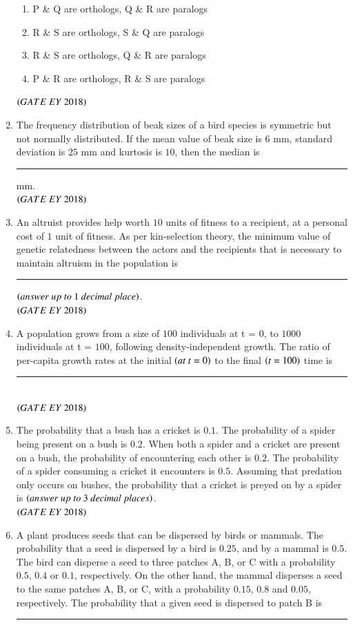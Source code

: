 \documentclass[journal]{IEEEtran}
\numberwithin{equation}{enumi}
\numberwithin{figure}{enumi}
\begin{document}
\begin{enumerate}
\begin{enumerate}
        \item P \& Q are orthologs, Q \& R are paralogs
        \item R \& S are orthologs, S \& Q are paralogs
        \item R \& S are orthologs, Q \& R are paralogs
        \item P \& R are orthologs, R \& S are paralogs
    \end{enumerate}
    \hfill{$\brak{ GATE\ EY\ 2018}$}
    \bigskip
\item The frequency distribution of beak sizes of a bird species is symmetric but not
normally distributed. If the mean value of beak size is $6$ mm, standard deviation is
$25$ mm and kurtosis is $10$, then the median is\rule{3cm}{0.15mm} mm.\\
   
    \hfill{$\brak{ GATE\ EY\ 2018}$}
    \bigskip
\item An altruist provides help worth $10$ units of fitness to a recipient, at a personal cost of
$1$ unit of fitness. As per kin-selection theory, the minimum value of genetic
relatedness between the actors and the recipients that is necessary to maintain
altruism in the population is\rule{3cm}{0.15mm} $\brak{answer\ up\ to\ 1\ decimal\ place}$.\\
   
    \hfill{$\brak{ GATE\ EY\ 2018}$}
    \bigskip
   \item A population grows from a size of $100$ individuals at t = $0$, to $1000$ individuals at
t = $100$, following density-independent growth. The ratio of per-capita growth rates
at the initial $\left(at\ t=0\right)$ to the final $\left(t=100\right)$ time is\rule{3cm}{0.15mm}\\
   
    \hfill{$\brak{ GATE\ EY\ 2018}$}
    \bigskip
\item The probability that a bush has a cricket is $0.1$. The probability of a spider being
present on a bush is $0.2$. When both a spider and a cricket are present on a bush, the
probability of encountering each other is $0.2$. The probability of a spider consuming
a cricket it encounters is $0.5$. Assuming that predation only occurs on bushes, the
probability that a cricket is preyed on by a spider is\underline{\hspace{3cm}}
$\brak{answer\ up\ to\ 3\ decimal\ places}$.\\
   
    \hfill{$\brak{ GATE\ EY\ 2018}$}
    \bigskip
\item A plant produces seeds that can be dispersed by birds or mammals. The probability
that a seed is dispersed by a bird is $0.25$, and by a mammal is $0.5$. The bird can
disperse a seed to three patches A, B, or C with a probability $0.5$, $0.4$ or $0.1$,
respectively. On the other hand, the mammal disperses a seed to the same patches
A, B, or C, with a probability $0.15$, $0.8$ and $0.05$, respectively. The probability that a
given seed is dispersed to patch B is\rule{3cm}{0.15mm}


\end{enumerate}
\end{document}
